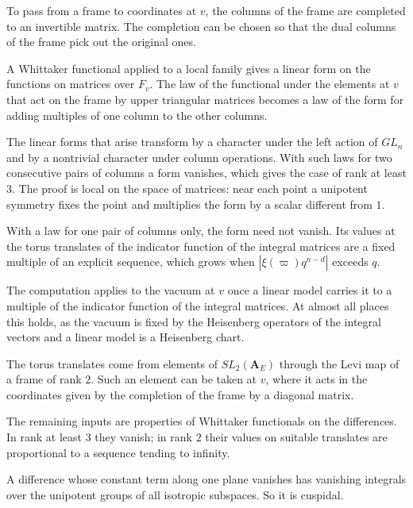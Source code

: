 To pass from a frame to coordinates at $v$, the columns of the frame are
completed to an invertible matrix. The completion can be chosen so that the
dual columns of the frame pick out the original ones.

A Whittaker functional applied to a local family gives a linear form on the
functions on matrices over $F_v$. The law of the functional under the elements
at $v$ that act on the frame by upper triangular matrices becomes a law of the
form for adding multiples of one column to the other columns.

The linear forms that arise transform by a character under the left action of
$GL_n$ and by a nontrivial character under column operations. With such laws
for two consecutive pairs of columns a form vanishes, which gives the case of
rank at least $3$. The proof is local on the space of matrices: near each point
a unipotent symmetry fixes the point and multiplies the form by a scalar
different from $1$.

With a law for one pair of columns only, the form need not vanish. Its values
at the torus translates of the indicator function of the integral matrices are
a fixed multiple of an explicit sequence, which grows when
$|\xi(\varpi)q^{n-d}|$ exceeds $q$.

The computation applies to the vacuum at $v$ once a linear model carries it to
a multiple of the indicator function of the integral matrices. At almost all
places this holds, as the vacuum is fixed by the Heisenberg operators of the
integral vectors and a linear model is a Heisenberg chart.

The torus translates come from elements of $SL_2(\mathbf A_E)$ through the Levi
map of a frame of rank $2$. Such an element can be taken at $v$, where it acts
in the coordinates given by the completion of the frame by a diagonal matrix.

The remaining inputs are properties of Whittaker functionals on the
differences. In rank at least $3$ they vanish; in rank $2$ their values on
suitable translates are proportional to a sequence tending to infinity.

A difference whose constant term along one plane vanishes has vanishing
integrals over the unipotent groups of all isotropic subspaces. So it is
cuspidal.

